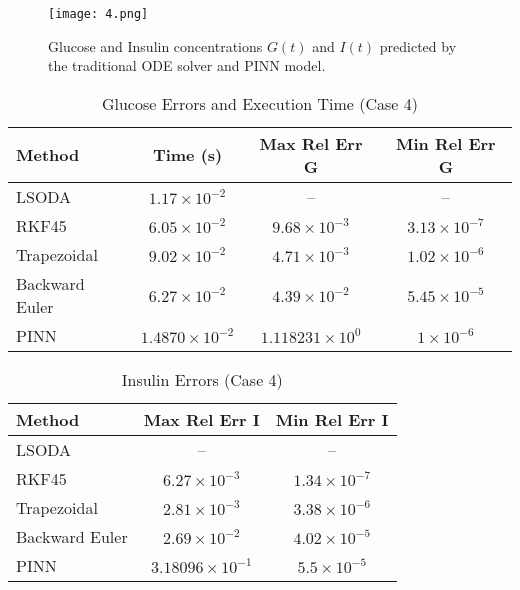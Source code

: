 \documentclass[conference]{IEEEtran}
\begin{document}
\begin{figure}[htbp]
    \centering
    \texttt{[image: 4.png]}
    \caption{Glucose and Insulin concentrations $G(t)$ and $I(t)$ predicted by the traditional ODE solver and PINN model.}
    \label{fig:case4}
\end{figure}
\vspace{-0.7cm}

\begin{table}[H]
\centering
\caption{Glucose Errors and Execution Time (Case 4)}
\begin{tabular}{|l|c|c|c|}
\hline
\textbf{Method} & \textbf{Time (s)} & \textbf{Max Rel Err G} & \textbf{Min Rel Err G} \\
\hline
LSODA & $1.17 \times 10^{-2}$ & -- & -- \\
RKF45 & $6.05 \times 10^{-2}$ & $9.68 \times 10^{-3}$ & $3.13 \times 10^{-7}$ \\
Trapezoidal & $9.02 \times 10^{-2}$ & $4.71 \times 10^{-3}$ & $1.02 \times 10^{-6}$ \\
Backward Euler & $6.27 \times 10^{-2}$ & $4.39 \times 10^{-2}$ & $5.45 \times 10^{-5}$ \\
PINN & $1.4870  \times 10^{-2}$ & $1.118231 \times 10^{0}$ & $1 \times 10^{-6}$ \\
\hline
\end{tabular}
\end{table}
\vspace{-0.5cm}
\begin{table}[H]
\centering
\caption{Insulin Errors (Case 4)}
\begin{tabular}{|l|c|c|}
\hline
\textbf{Method} & \textbf{Max Rel Err I} & \textbf{Min Rel Err I} \\
\hline
LSODA & -- & -- \\
RKF45 & $6.27 \times 10^{-3}$ & $1.34 \times 10^{-7}$ \\
Trapezoidal & $2.81 \times 10^{-3}$ & $3.38 \times 10^{-6}$ \\
Backward Euler & $2.69 \times 10^{-2}$ & $4.02 \times 10^{-5}$ \\
PINN & $3.18096 \times 10^{-1}$ & $5.5 \times 10^{-5}$ \\
\hline
\end{tabular}
\end{table}
\end{document}
